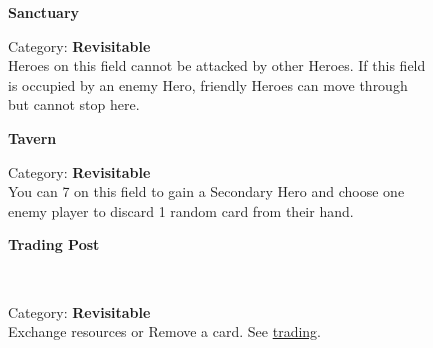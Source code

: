 \begin{figure}
  \begin{minipage}[t]{0.48\textwidth}
    \centering
    \textbf{Sanctuary}\\
    \caption{Category: \textbf{Revisitable}\\
      Heroes on this field cannot be attacked by other Heroes.
      If this field is occupied by an enemy Hero, friendly Heroes can move through but cannot stop here.}
  \end{minipage}\hfill
  \begin{minipage}[t]{0.48\textwidth}
    \centering
    \textbf{Tavern}\par
    \caption{Category: \textbf{Revisitable}\\You can 
    7 
    on this field to gain a Secondary Hero and choose one enemy player to discard 1 random card from their hand.}
  \end{minipage}
\end{figure}

\begin{figure}
  \begin{minipage}[t]{0.48\textwidth}
    \centering
    \hypertarget{Trading Post}{\textbf{Trading Post}}\\
    \caption{Category: \textbf{Revisitable}\\
      Exchange resources or Remove a card.
      See \protect\hyperlink{Trading}{trading}.}
  \end{minipage}
\end{figure}

\clearpage

